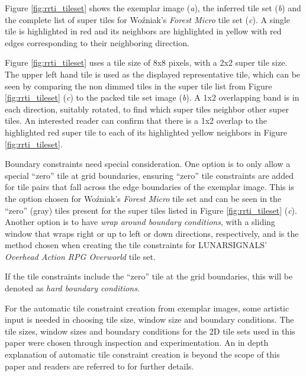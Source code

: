 Figure \ref{fig:rrti_tileset} shows the exemplar image (\textit{a}), the inferred tile set (\textit{b}) and the complete list of super tiles
for Wo\'zniak's \textit{Forest Micro} tile set (\textit{c}).
A single tile is highlighted in red and its neighbors are highlighted in yellow with red edges corresponding to their neighboring direction.

Figure \ref{fig:rrti_tileset} uses a tile size of 8x8 pixels, with a 2x2 super tile size.
The upper left hand tile is used as the displayed representative tile, which can be seen by comparing the non dimmed tiles in the
super tile list from Figure \ref{fig:rrti_tileset} (\textit{c}) to the packed tile set image (\textit{b}).
A 1x2 overlapping band is in each direction, suitably rotated, to find which super tiles neighbor other super tiles.
An interested reader can confirm that there is a 1x2 overlap to the highlighted red super tile to each of its highlighted yellow neighbors
in Figure \ref{fig:rrti_tileset}.

Boundary constraints need special consideration.
One option is to only allow a special ``zero'' tile at grid boundaries, ensuring ``zero'' tile constraints are added
for tile pairs that fall across the edge boundaries of the exemplar image.
This is the option chosen for Wo\'zniak's \textit{Forest Micro} tile set and can be seen in the ``zero'' (gray) tiles present for
the super tiles listed in Figure \ref{fig:rrti_tileset} (\textit{c}).
Another option is to have \textit{wrap around boundary conditions}, with a sliding window that wraps right or up to left or down directions, respectively,
and is the method chosen when creating the tile constraints for LUNARSIGNALS' \textit{Overhead Action RPG Overworld} tile set.

If the tile constraints include the ``zero'' tile at the grid boundaries, this will be denoted as \textit{hard boundary conditions}.


For the automatic tile constraint creation from exemplar images, some artistic input is needed in choosing tile size, window size and boundary conditions.
The tile sizes, window sizes and boundary conditions for the 2D tile sets used in this paper were chosen through inspection and experimentation.
An in depth explanation of automatic tile constraint creation is beyond the scope of this paper and readers are referred to \cite{Gumin_2016, Sherratt_2019, BorisTheBrave_wfc_2021} for further details.

